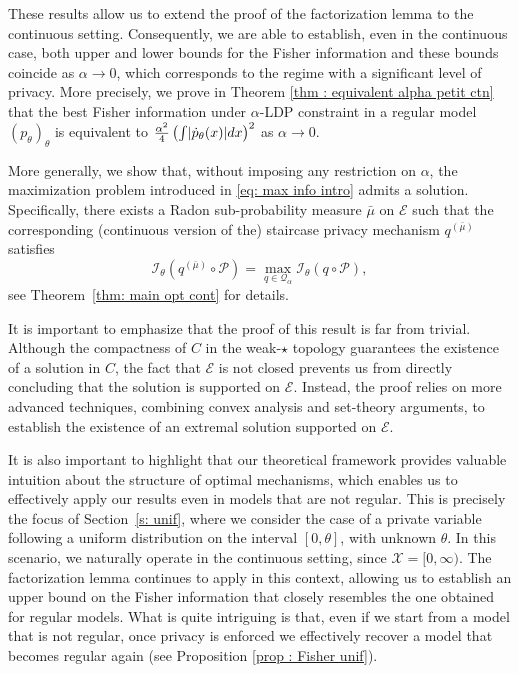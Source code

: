 \documentclass[a4paper, 11pt]{article}
\theoremstyle{definition}
\newcommand{\theconvex}{C}
\DeclarePairedDelimiter{\abs}{\lvert}{\rvert}
\begin{document}
{These results allow us to extend the proof of the factorization lemma to the continuous setting. Consequently, we are able to establish, even in the continuous %
case, both upper and lower bounds for the Fisher information and these bounds coincide as \(\alpha \to 0\), which corresponds to the regime with a significant level of privacy. More precisely, we prove in Theorem \ref{thm : equivalent alpha petit ctn} that the best Fisher information under $\alpha$-LDP constraint in a regular model $(p_\theta)_\theta$ is equivalent to $\frac{\alpha^2}{4} \left( \int \abs{\dot{p}_{\theta}(x)} dx \right)^2$ as $\alpha\to0$.




More generally, we show that, without imposing any restriction on \(\alpha\), the maximization problem introduced in \eqref{eq: max info intro} admits a solution. Specifically, there exists a Radon sub-probability measure \(\bar{\mu}\) on \(\mathcal{E}\) such that the corresponding (continuous version of the) staircase privacy mechanism \(q^{(\bar{\mu})}\) satisfies
\[
\mathcal{I}_{\theta}(q^{(\bar{\mu})} \circ \mathcal{P}) = \max_{q \in \mathcal{Q}_\alpha} \mathcal{I}_{\theta}(q \circ \mathcal{P}),
\]
see Theorem~\ref{thm: main opt cont} for details.

It is important to emphasize that the proof of this result is far from trivial. Although the compactness of \(\theconvex\) in the weak-\(\star\) topology guarantees the existence of a solution in \(\theconvex\), the fact that \(\mathcal{E}\) is not closed prevents us from directly concluding that the solution is supported on \(\mathcal{E}\). Instead, the proof relies on more advanced techniques, combining convex analysis and set-theory arguments, %
to establish the existence of an extremal solution supported on \(\mathcal{E}\).


It is also important to highlight that our theoretical framework provides valuable intuition about the structure of optimal mechanisms, which enables us to effectively apply our results even in models that are not regular. This is precisely the focus of Section~\ref{s: unif}, where we consider the case of a private variable following a uniform distribution on the interval \([0, \theta]\), with unknown \(\theta\). In this scenario, we naturally operate in the continuous setting, since \(\mathcal{X} = [0, \infty)\). The factorization lemma continues to apply in this context, allowing us to establish an upper bound on the Fisher information that closely resembles the one obtained for regular models. What is quite intriguing is that, even if we start from a model that is not regular, once privacy is enforced we effectively recover a model that becomes regular again (see Proposition \ref{prop : Fisher unif}).


}
\end{document}
